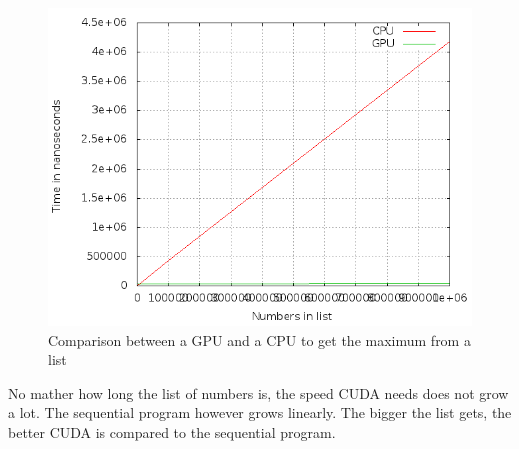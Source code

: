 \documentclass[a4paper]{article}
\begin{document}
  \begin{figure}[H]
	  \begin{center}
		  \includegraphics[scale=0.5]{6_2_1.png}
	  \end{center}
	  \caption{Comparison between a GPU and a CPU to get the maximum from a list}
	  \label{fig:6_2_1}
  \end{figure}
  No mather how long the list of numbers is, the speed CUDA needs does not grow a lot.
  The sequential program however grows linearly.
  The bigger the list gets, the better CUDA is compared to the sequential program.
\end{document}
